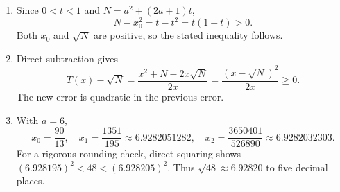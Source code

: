 \begin{enumerate}
\item Since $0<t<1$ and $N=a^2+(2a+1)t$,
\[
N-x_0^2=t-t^2=t(1-t)>0.
\]
Both $x_0$ and $\sqrt N$ are positive, so the stated inequality follows.
\item Direct subtraction gives
\[
T(x)-\sqrt N=\dfrac{x^2+N-2x\sqrt N}{2x}
=\dfrac{(x-\sqrt N)^2}{2x}\ge0.
\]
The new error is quadratic in the previous error.
\item With $a=6$,
\[
x_0=\dfrac{90}{13},\quad
x_1=\dfrac{1351}{195}\approx6.9282051282,\quad
x_2=\dfrac{3650401}{526890}\approx6.9282032303.
\]
For a rigorous rounding check, direct squaring shows
$(6.928195)^2<48<(6.928205)^2$. Thus $\boxed{\sqrt{48}\approx6.92820}$ to five decimal places.
\end{enumerate}
